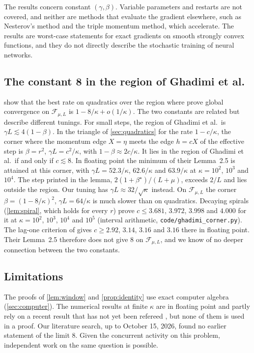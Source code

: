 \documentclass[11pt, a4paper]{article}
\newcommand{\file}{\nolinkurl}  %
\theoremstyle{definition}
\newcommand{\F}{\mathcal{F}_{\mu,L}}
\begin{document}
The results concern constant $(\gamma,\beta)$. Variable parameters and restarts are not covered, and neither are methods
that evaluate the gradient elsewhere, such as Nesterov's method and the triple momentum method, which accelerate. The
results are worst-case statements for exact gradients on smooth strongly convex functions, and they do not directly
describe the stochastic training of neural networks.

\subsection{The constant 8 in the region of Ghadimi et al.}
\label{sec:ghadimi}

 show that the best rate on quadratics over the region where
\citet[Thm.~4]{ghadimi2015global} prove global convergence on $\F$ is $1-8/\kappa+o(1/\kappa)$. The two constants are
related but describe different tunings. For small steps, the region of Ghadimi et al.\ is $\gamma L\lesssim4(1-\beta)$.
In the triangle of \cref{sec:quadratics} for the rate $1-c/\kappa$, the corner where the momentum edge $X=\eta$ meets the
edge $h=cX$ of the effective step is $\beta=r^2$, $\gamma L=c^2/\kappa$, with $1-\beta\approx2c/\kappa$. It lies in the
region of Ghadimi et al.\ if and only if $c\lesssim8$. In floating point the minimum of their Lemma~2.5 is attained at
this corner, with $\gamma L=52.3/\kappa$, $62.6/\kappa$ and $63.9/\kappa$ at $\kappa=10^2$, $10^3$ and $10^4$. The step
printed in the lemma, $2(1+\beta^\star)/(L+\mu)$, exceeds $2/L$ and lies outside the region. Our tuning has
$\gamma L\approx32/\sqrt\kappa$ instead. On $\F$ the corner $\beta=(1-8/\kappa)^2$, $\gamma L=64/\kappa$ is much slower
than on quadratics. Decaying spirals (\cref{lem:spiral}, which holds for every $r$) prove $c\le3.681$, $3.972$, $3.998$
and $4.000$ for it at $\kappa=10^2$, $10^3$, $10^4$ and $10^5$ (interval arithmetic, \file{code/ghadimi_corner.py}). The
lag-one criterion of \citet{pasechniuk2026two} gives $c\ge2.92$, $3.14$, $3.16$ and $3.16$ there in floating point.
Their Lemma~2.5 therefore does not give $8$ on $\F$, and we know of no deeper connection between the two constants.

\subsection{Limitations}

The proofs of \cref{lem:window} and \cref{prop:identity} use exact computer algebra (\cref{sec:computer}). The numerical
results at finite $\kappa$ are in floating point and partly rely on a recent result that has not yet been refereed
\citep{pasechniuk2026two}, but none of them is used in a proof. Our literature search, up to October 15, 2026, found no
earlier statement of the limit $8$. Given the concurrent activity on this problem, independent work on the same question
is possible.
\end{document}
